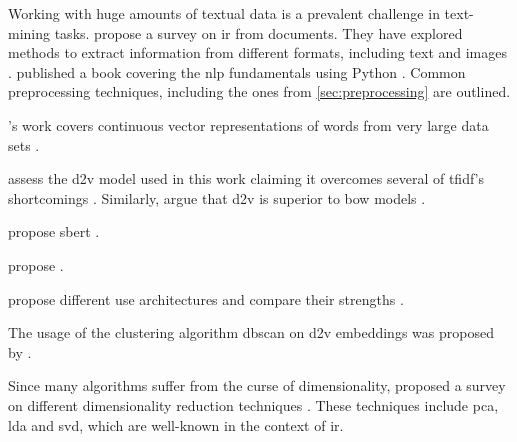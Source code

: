 

Working with huge amounts of textual data is a prevalent challenge in text-mining tasks.
\citeauthor{InformationRetrieval1999} propose a survey on \ac{ir} from documents.
They have explored methods to extract information from different formats, including text and images \cite{InformationRetrieval1999}.
\citeauthor{nlp-book2009} published a book covering the \ac{nlp} fundamentals using Python \cite{nlp-book2009}.
Common preprocessing techniques, including the ones from \autoref{sec:preprocessing} are outlined. 

\citeauthor{WordRep2013}'s work covers continuous vector representations of words from very large data sets \cite{WordRep2013}.


\citeauthor{clusteringDocs2020} assess the \ac{d2v} model used in this work claiming it overcomes several of \ac{tfidf}'s shortcomings \cite{clusteringDocs2020}.
Similarly, \citeauthor{SentRep2014} argue that \ac{d2v} is superior to \ac{bow} models \cite{SentRep2014}.

\citeauthor{HfsentTrans2019} propose \ac{sbert} \cite{HfsentTrans2019}.

\citeauthor{inferSent2018} propose \infersent{} \cite{inferSent2018}.

\citeauthor{UniversalSentEnc2018} propose different \ac{use} architectures and compare their strengths \cite{UniversalSentEnc2018}.




The usage of the clustering algorithm \ac{dbscan} on \ac{d2v} embeddings was proposed by \citeauthor{clusteringDocs2020} \cite{clusteringDocs2020}.

Since many algorithms suffer from the curse of dimensionality, \citeauthor{dim_reduction2021} proposed a survey on different dimensionality reduction techniques \cite{dim_reduction2021}.
These techniques include \ac{pca}, \ac{lda} and \ac{svd}, which are well-known in the context of \ac{ir}.